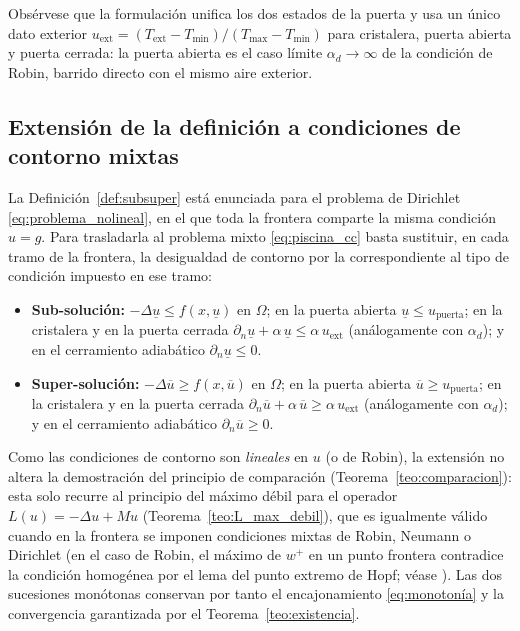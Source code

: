 \begin{itemize}
Obsérvese que la formulación unifica los dos estados de la puerta y usa un
único dato exterior $u_{\mathrm{ext}} = (T_{\mathrm{ext}}-T_{\min})/(T_{\max}-T_{\min})$
para cristalera, puerta abierta y puerta cerrada: la puerta abierta es el caso
límite $\alpha_d \to \infty$ de la condición de Robin, barrido directo con el
mismo aire exterior.

\subsection{Extensión de la definición a condiciones de contorno mixtas}

La Definición~\ref{def:subsuper} está enunciada para el problema de Dirichlet
\eqref{eq:problema_nolineal}, en el que toda la frontera comparte la misma
condición $u = g$. Para trasladarla al problema mixto \eqref{eq:piscina_cc} basta
sustituir, en cada tramo de la frontera, la desigualdad de contorno por la
correspondiente al tipo de condición impuesto en ese tramo:

\begin{itemize}
  \item \textbf{Sub-solución:} $-\Delta \underline{u} \leq f(x,\underline{u})$ en
  $\Omega$; en la puerta abierta $\underline{u} \leq u_{\mathrm{puerta}}$; en la
  cristalera y en la puerta cerrada
  $\partial_n \underline{u} + \alpha\,\underline{u} \leq \alpha\,u_{\mathrm{ext}}$
  (análogamente con $\alpha_d$); y en el cerramiento adiabático
  $\partial_n \underline{u} \leq 0$.

  \item \textbf{Super-solución:} $-\Delta \overline{u} \geq f(x,\overline{u})$ en
  $\Omega$; en la puerta abierta $\overline{u} \geq u_{\mathrm{puerta}}$; en la
  cristalera y en la puerta cerrada
  $\partial_n \overline{u} + \alpha\,\overline{u} \geq \alpha\,u_{\mathrm{ext}}$
  (análogamente con $\alpha_d$); y en el cerramiento adiabático
  $\partial_n \overline{u} \geq 0$.
\end{itemize}

Como las condiciones de contorno son \textit{lineales} en $u$ (o de Robin), la
extensión no altera la demostración del principio de comparación
(Teorema~\ref{teo:comparacion}): esta solo recurre al principio del máximo débil
para el operador $L(u) = -\Delta u + M u$ (Teorema~\ref{teo:L_max_debil}), que es
igualmente válido cuando en la frontera se imponen condiciones mixtas de Robin,
Neumann o Dirichlet (en el caso de Robin, el máximo de $w^{+}$ en un punto
frontera contradice la condición homogénea por el lema del punto extremo de
Hopf; véase \cite{GilbargTrudinger}). Las dos sucesiones monótonas conservan por
tanto el encajonamiento \eqref{eq:monotonía} y la convergencia garantizada por el
Teorema~\ref{teo:existencia}.


\end{itemize}
